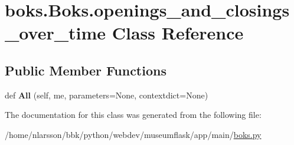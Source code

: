 \hypertarget{classboks_1_1Boks_1_1openings__and__closings__over__time}{}\section{boks.\+Boks.\+openings\+\_\+and\+\_\+closings\+\_\+over\+\_\+time Class Reference}
\label{classboks_1_1Boks_1_1openings__and__closings__over__time}
\subsection*{Public Member Functions}
\begin{DoxyCompactItemize}
\item 
\mbox{\label{classboks_1_1Boks_1_1openings__and__closings__over__time_a625815be53f773b57ed86dbf87af670f}} 
def {\bfseries All} (self, me, parameters=None, contextdict=None)
\end{DoxyCompactItemize}


The documentation for this class was generated from the following file\+:\begin{DoxyCompactItemize}
\item 
/home/nlarsson/bbk/python/webdev/museumflask/app/main/\mbox{\hyperlink{boks_8py}{boks.\+py}}\end{DoxyCompactItemize}
